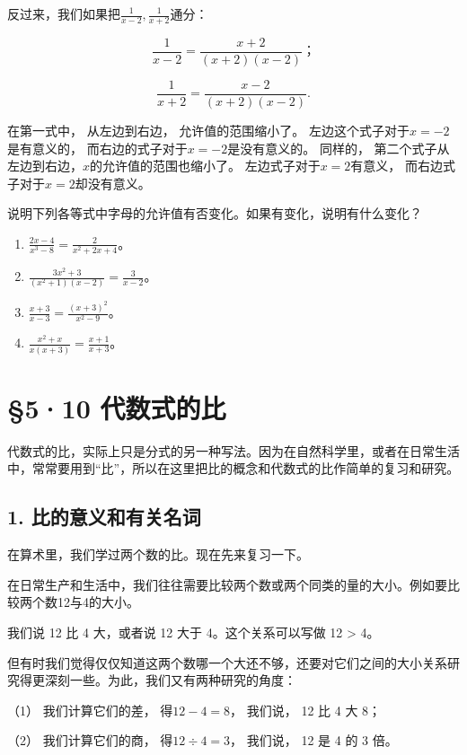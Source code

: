 反过来，我们如果把\(\frac{1}{x - 2}, \frac{1}{x + 2}\)通分：

\[
\frac{1}{x - 2} = \frac{x + 2}{(x + 2) (x - 2)}\text{；}
\]

\[
\frac{1}{x + 2} = \frac{x - 2}{(x + 2) (x - 2)}.
\]

在第一式中， 从左边到右边， 允许值的范围缩小了。
左边这个式子对于\(x = -2\)是有意义的，
而右边的式子对于\(x = -2\)是没有意义的。 同样的，
第二个式子从左边到右边，\(x\)的允许值的范围也缩小了。
左边式子对于\(x = 2\)有意义， 而右边式子对于\(x = 2\)却没有意义。

说明下列各等式中字母的允许值有否变化。如果有变化，说明有什么变化？

\begin{enumerate}[start=1]
\item
  \(\frac{2x - 4}{x^3 - 8} = \frac{2}{x^2 + 2x + 4}\)。
\item
  \(\frac{3x^2 + 3}{(x^2 + 1)(x - 2)} = \frac{3}{x - 2}\)。
\item
  \(\frac{x + 3}{x - 3} = \frac{(x + 3)^2}{x^2 - 9}\)。
\item
  \(\frac{x^2 + x}{x(x + 3)} = \frac{x + 1}{x + 3}\)。
\end{enumerate}

\section{§5·10 代数式的比}

代数式的比，实际上只是分式的另一种写法。因为在自然科学里，或者在日常生活中，常常要用到``比''，所以在这里把比的概念和代数式的比作简单的复习和研究。

\subsection{1. 比的意义和有关名词}

在算术里，我们学过两个数的比。现在先来复习一下。

在日常生产和生活中，我们往往需要比较两个数或两个同类的量的大小。例如要比较两个数12与4的大小。

我们说 12 比 4 大，或者说 12 大于 4。这个关系可以写做 12 \textgreater{}
4。

但有时我们觉得仅仅知道这两个数哪一个大还不够，还要对它们之间的大小关系研究得更深刻一些。为此，我们又有两种研究的角度：

（1） 我们计算它们的差， 得\(12 - 4 = 8\)， 我们说， 12 比 4 大 8；

（2） 我们计算它们的商， 得\(12 \div 4 = 3\)， 我们说， 12 是 4 的 3
倍。

